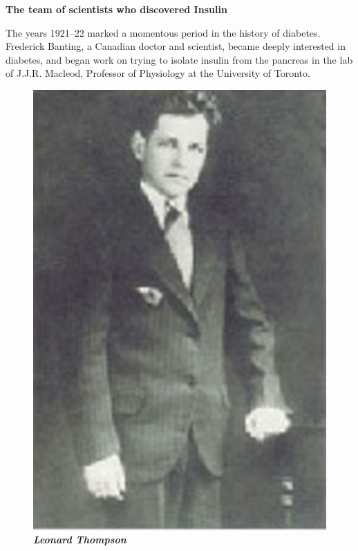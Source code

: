 \clearpage

\begin{center}
\textbf{The team of scientists who discovered Insulin}
\end{center}

The years 1921–22 marked a momentous period in the history of diabetes. Frederick Banting, a Canadian doctor and scientist, became deeply interested in diabetes, and began work on trying to isolate insu\-lin from the pancreas in the lab of J.J.R. Macleod, Professor of Physio\-logy at the University of Toronto.

\begin{figure}
\centering
\includegraphics[scale=.7]{images/015.jpg}\\
\textbf{\textit{Leonard Thompson}}
\end{figure}

